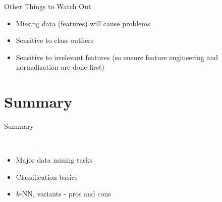 \documentclass{beamer}
\newcommand{\tblue}[1]{{\Large {\textcolor{azure}{#1}}}}
\begin{document}
\begin{frame}{Other Things to Watch Out}
    \begin{itemize}
        \item Missing data (features) will cause problems
        \item Sensitive to class outliers
        \item Sensitive to irrelevant features (so ensure feature engineering and normalization are done first)
    \end{itemize}
\end{frame}



\section{Summary}
\begin{frame}{Summary}

\tblue{Major Concepts:}
\begin{itemize}
    \item Major data mining tasks
    \item Classification basics
    \item $k$-NN, variants - pros and cons
\end{itemize}
\end{frame}


\end{document}

